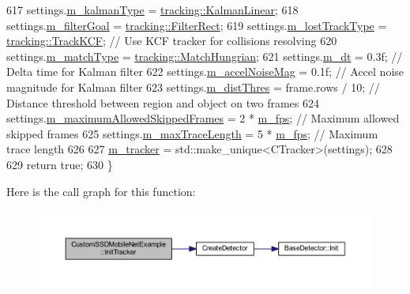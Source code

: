 \begin{DoxyCode}
617         settings.\mbox{\hyperlink{struct_tracker_settings_a3856a809067135c1c3f2d3c61fc4d6b7}{m\_kalmanType}} = \mbox{\hyperlink{namespacetracking_a83f2c4d58ea2737f7d6296dce3eb722aa889eca583e371386c92e05814797a885}{tracking::KalmanLinear}};
618         settings.\mbox{\hyperlink{struct_tracker_settings_afd6c83aa8b0eaa4f131f45852a0b89e4}{m\_filterGoal}} = \mbox{\hyperlink{namespacetracking_a9b3e7d16c86cd8b781ab214e396b0ebfabb259eae9513c55b313c553ce6249aea}{tracking::FilterRect}};
619         settings.\mbox{\hyperlink{struct_tracker_settings_a61a59f1c5bcc2ee76cef1b174d4bb8a4}{m\_lostTrackType}} = \mbox{\hyperlink{namespacetracking_a5377d69122ad915004ef68a518d22be3a9bba8e4377e562caa976576d47c5eb2e}{tracking::TrackKCF}};       \textcolor{comment}{// Use KCF
       tracker for collisions resolving}
620         settings.\mbox{\hyperlink{struct_tracker_settings_a94a05cbda5eeeac7fa1b64baf9c703f5}{m\_matchType}} = \mbox{\hyperlink{namespacetracking_a491e50c9261ab820965d871a217d4f13a8c97315e46df8c0716a9538655fc967d}{tracking::MatchHungrian}};
621         settings.\mbox{\hyperlink{struct_tracker_settings_ae876ad4f3599a782cddb37e318430aaa}{m\_dt}} = 0.3f;                                \textcolor{comment}{// Delta time for Kalman filter}
622         settings.\mbox{\hyperlink{struct_tracker_settings_a9d4bcf1b68d5a13de8f9fea89f3b694f}{m\_accelNoiseMag}} = 0.1f;                     \textcolor{comment}{// Accel noise magnitude for
       Kalman filter}
623         settings.\mbox{\hyperlink{struct_tracker_settings_a10e76ae03bd840f6c9180ce67faaa83c}{m\_distThres}} = frame.rows / 10;              \textcolor{comment}{// Distance threshold between
       region and object on two frames}
624         settings.\mbox{\hyperlink{struct_tracker_settings_a7825c3e88ee979fba2844c238fc51139}{m\_maximumAllowedSkippedFrames}} = 2 * 
      \mbox{\hyperlink{class_video_example_ae8110012f8d57f39d6355377cf20fb27}{m\_fps}};  \textcolor{comment}{// Maximum allowed skipped frames}
625         settings.\mbox{\hyperlink{struct_tracker_settings_abc7ce62dfe8de5ae33506aac41fddcac}{m\_maxTraceLength}} = 5 * \mbox{\hyperlink{class_video_example_ae8110012f8d57f39d6355377cf20fb27}{m\_fps}};               \textcolor{comment}{// Maximum trace length}
626 
627         \mbox{\hyperlink{class_video_example_a7c58cd8c883981b2e645d1a3d8edf76a}{m\_tracker}} = std::make\_unique<CTracker>(settings);
628 
629         \textcolor{keywordflow}{return} \textcolor{keyword}{true};
630     \}
\end{DoxyCode}
Here is the call graph for this function\+:\nopagebreak
\begin{figure}[H]
\begin{center}
\leavevmode
\includegraphics[width=350pt]{class_custom_s_s_d_mobile_net_example_a5d5c5184860ac247bd2f562d6678e5e2_cgraph}
\end{center}
\end{figure}
